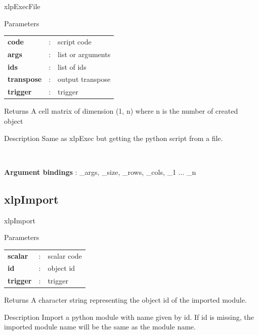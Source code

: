 \begin{xlpfunctitle}{xlpExecFile}

\begin{xlpfunc}{Parameters}
\begin{tabular}{p{3.5cm}cl}
\textbf{code}& : & script code \\
\textbf{args}& : & list or arguments \\
\textbf{ids}& : & list of ids \\
\textbf{transpose}& : & output transpose \\
\textbf{trigger}& : & trigger \\
\end{tabular}
\end{xlpfunc}


\begin{xlpfunc}{Returns}
A cell matrix of dimension (1, n) where n is the number of created object  
\end{xlpfunc}

\begin{xlpfunc}{Description}
Same as xlpExec but getting the python script from a file.

\

\textbf{Argument bindings} : \_args, \_size, \_rows, \_cols, \_1 ... \_n
 
\end{xlpfunc}
\end{xlpfunctitle}



\subsection{xlpImport}


\begin{xlpfunctitle}{xlpImport}

\begin{xlpfunc}{Parameters}
\begin{tabular}{p{3.5cm}cl}
\textbf{scalar}& : & scalar code\\
\textbf{id}& : & object id \\
\textbf{trigger}& : & trigger \\
\end{tabular}
\end{xlpfunc}


\begin{xlpfunc}{Returns}
A character string representing the object id of the imported module. 
\end{xlpfunc}

\begin{xlpfunc}{Description}
Import a python module with name given by id. If id is missing, the imported module name will be the same as the module name. 
\end{xlpfunc}
\end{xlpfunctitle}


